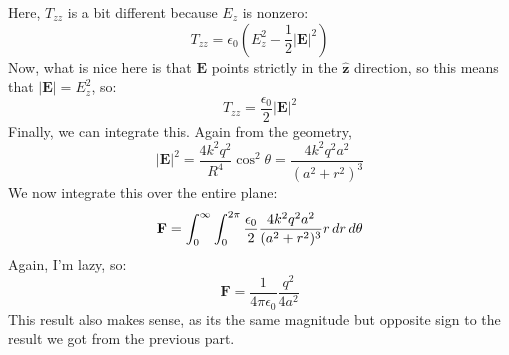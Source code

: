 \documentclass[10pt]{article}
\begin{document}
\begin{enumerate}[label=(\alph*)]
			\begin{solution}
				Here, \( T_{zz} \) is a bit different because \( E_z \) is nonzero:
				\[
					T_{zz} = \epsilon_0 \left( E_z^2 - \frac{1}{2}|\mathbf{E}|^2 \right)
				\]
				Now, what is nice here is that \( \mathbf{E} \) points strictly in the \( \hat{\mathbf{z}} \)
				direction, so this means that \( |\mathbf{E}| = E_z^2 \), so:
				\[
					T_{zz} = \frac{\epsilon_0}{2} |\mathbf{E}|^2
				\]
				Finally, we can integrate this. Again from the geometry, 
				\[
					|\mathbf{E}|^2 = \frac{4k^2q^2}{R^{4}}\cos^2 \theta = \frac{4k^2q^2a^2}{(a^2 + r^2)^3}
				\]
				We now integrate this over the entire plane:
				\[
					\mathbf{F} = \int_{0}^{\infty}\int_{0}^{2\pi} \frac{\epsilon_0}{2}\frac{4k^2q^2 a^2}{(a^2
					+ r^2)^3} r \,d r \,d \theta 
				\]
				Again, I'm lazy, so:
				\[
					\mathbf{F} = \frac{1}{4\pi \epsilon_0}\frac{q^2}{4a^2}
				\]
				This result also makes sense, as its the same magnitude but opposite sign to the result we
				got from the previous part.  
			\end{solution}
	\end{enumerate}
\end{document}
